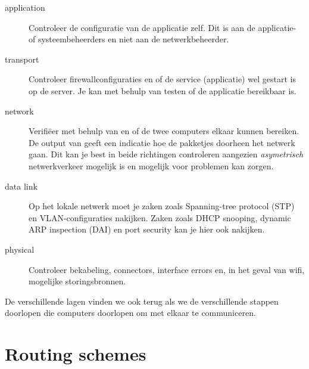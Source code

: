 \begin{description}
\item[application]
   Controleer de configuratie van de applicatie zelf.
   Dit is aan de applicatie- of systeembeheerders en niet aan de netwerkbeheerder.
\item[transport]
   Controleer firewallconfiguraties en of de service (applicatie) wel gestart is op de server.
   Je kan met behulp van  testen of de applicatie bereikbaar is.
\item[network]
   Verifiëer met behulp van  en  of de twee computers elkaar kunnen bereiken.
   De output van  geeft een indicatie hoe de pakketjes doorheen het netwerk gaan.
   Dit kan je best in beide richtingen controleren aangezien \emph{asymetrisch} netwerkverkeer mogelijk is en mogelijk voor problemen kan zorgen.
\item[data link]
   Op het lokale netwerk moet je zaken zoals Spanning-tree protocol (STP) en VLAN-configuraties nakijken.
   Zaken zoals DHCP snooping, dynamic ARP inspection (DAI) en port security kan je hier ook nakijken.
\item[physical]
  Controleer bekabeling, connectors, interface errors en, in het geval van wifi, mogelijke storingsbronnen.
\end{description}

De verschillende lagen vinden we ook terug als we de verschillende stappen doorlopen die computers doorlopen om met elkaar te communiceren.




\section{Routing schemes}

